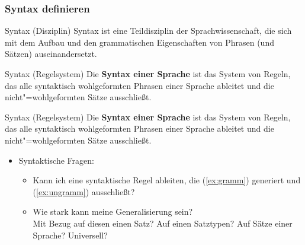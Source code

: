 \begin{frame}
\frametitle{Syntax definieren}

\begin{block}{Syntax (Disziplin)}
Syntax ist eine Teildisziplin der Sprachwissenschaft, die sich mit dem Aufbau und den grammatischen Eigenschaften von Phrasen (und Sätzen) auseinandersetzt.
\end{block}

\begin{block}{Syntax (Regelsystem)}
Die \textbf{Syntax einer Sprache} ist das System von Regeln, das alle syntaktisch wohlgeformten Phrasen einer Sprache ableitet und die nicht"=wohlgeformten Sätze ausschließt.
\end{block}

\end{frame}






\begin{frame}

\begin{block}{Syntax (Regelsystem)}
Die \textbf{Syntax einer Sprache} ist das System von Regeln, das alle syntaktisch wohlgeformten Phrasen einer Sprache ableitet und die nicht"=wohlgeformten Sätze ausschließt.
\end{block}

	\settowidth{\textwidth}{Nicht-wohlgeformt}
	\z
	
	\z
	
\begin{itemize}
	\item Syntaktische Fragen:\\
	\begin{itemize}
		\item Kann ich eine syntaktische Regel ableiten, die (\ref{ex:gramm}) generiert und (\ref{ex:ungramm}) ausschließt?
		\item Wie stark kann meine Generalisierung sein?\\
		\ras Mit Bezug auf diesen einen Satz? Auf einen Satztypen? Auf Sätze einer Sprache? Universell?
	\end{itemize}

\end{itemize}

\end{frame}


